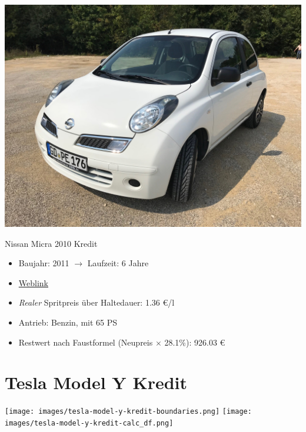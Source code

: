 \documentclass[landscape, DIV=99, 14pt]{scrartcl}
\begin{document}
\pagebreak
\null
\vspace{2cm}
\begin{center}
\includegraphics[width=0.9\columnwidth]{cars/nissan-micra.jpg}

Nissan Micra 2010 Kredit
\end{center}

\begin{itemize}
    \item Baujahr: 2011 $\rightarrow$ Laufzeit: 6 Jahre
    \item \href{https://de.wikipedia.org/wiki/Nissan_Micra\#Micra_(K12,_2003%E2%80%932010)}{Weblink}
    \item \emph{Realer} Spritpreis \"uber Haltedauer: 1.36 \euro{}/l
    \item Antrieb: Benzin, mit 65 PS
    \item Restwert nach Faustformel (Neupreis $\times$ 28.1\%): 926.03 \euro{}
\end{itemize}

\pagebreak


\twocolumn

\section*{Tesla Model Y Kredit}
\begin{center}
\texttt{[image: images/tesla-model-y-kredit-boundaries.png]}
\null
\vspace{0.5cm}
\texttt{[image: images/tesla-model-y-kredit-calc\_df.png]}
\end{center}
\end{document}
